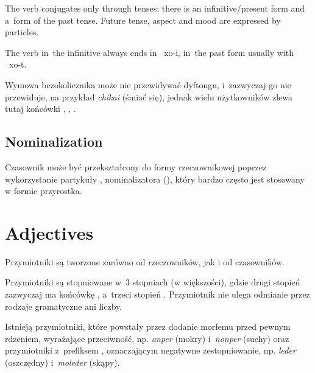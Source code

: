 The verb conjugates only through tenses: there is an infinitive/present form and
a~form of the past tense. Future tense, aspect and mood are expressed by
particles.

The verb in~the infinitive always ends in ~xo{-i}, in~the past form
usually with ~xo{-t}.



Wymowa bezokolicznika może nie przewidywać dyftongu, i~zazwyczaj go nie
przewiduje, na przykład \emph{chikai}  (śmiać się), jednak wielu
użytkowników zlewa tutaj końcówki , , .

\skipline

\subsection{Nominalization}

Czasownik może być przekształcony do formy rzeczownikowej poprzez wykorzystanie
partykuły , nominalizatora (\Nmlz{}), który bardzo często jest stosowany w
formie przyrostka.




\section{Adjectives}

Przymiotniki są tworzone zarówno od rzeczowników, jak i od czasowników.

Przymiotniki są stopniowane w~3 stopniach (w większości), gdzie drugi stopień
zazwyczaj ma końcówkę , a~trzeci stopień . Przymiotnik nie
ulega odmianie przez rodzaje gramatyczne ani liczby.

Istnieją przymiotniki, które powstały przez dodanie morfemu  przed
pewnym rdzeniem, wyrażające przeciwność, np. \emph{anper}  (mokry)
i~\emph{nonper}  (suchy) oraz przymiotniki z~prefiksem ,
oznaczającym negatywne zestopniowanie, np. \emph{leder}  (oszczędny)
i~\emph{moleder}  (skąpy).

